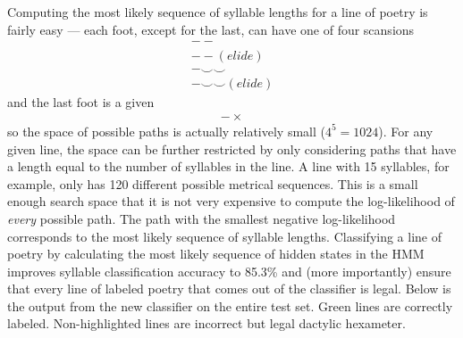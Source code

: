 \documentclass[12pt]{article}
\begin{document}
Computing the most likely sequence of syllable lengths for a line of poetry is fairly easy --- each foot, except for the last, can have one of four scansions
\begin{gather}
- - \\
- - (elide) \\
- \smallsmile \smallsmile \\
- \smallsmile \smallsmile (elide)
\end{gather}
and the last foot is a given
\begin{align*}
- \times
\end{align*}
so the space of possible paths is actually relatively small ($4^5 = 1024$). For any given line, the space can be further restricted by only considering paths that have a length equal to the number of syllables in the line. A line with 15 syllables, for example, only has 120 different possible metrical sequences. This is a small enough search space that it is not very expensive to compute the log-likelihood of \emph{every} possible path. The path with the smallest negative log-likelihood corresponds to the most likely sequence of syllable lengths. Classifying a line of poetry by calculating the most likely sequence of hidden states in the HMM improves syllable classification accuracy to 85.3\% and (more importantly) ensure that every line of labeled poetry that comes out of the classifier is legal. Below is the output from the new classifier on the entire test set. Green lines are correctly labeled. Non-highlighted lines are incorrect but legal dactylic hexameter.
\end{document}
